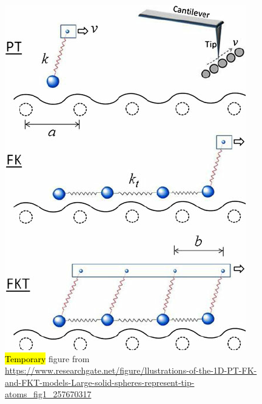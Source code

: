 \begin{figure}[H]
  \centering
  \includegraphics[width=0.4\linewidth]{figures/theory/PT_FK_FKT.png}
  \caption{\hl{Temporary} figure from \url{https://www.researchgate.net/figure/llustrations-of-the-1D-PT-FK-and-FKT-models-Large-solid-spheres-represent-tip-atoms_fig1_257670317}}
  \label{fig:PT_FK_FKT}
\end{figure}












